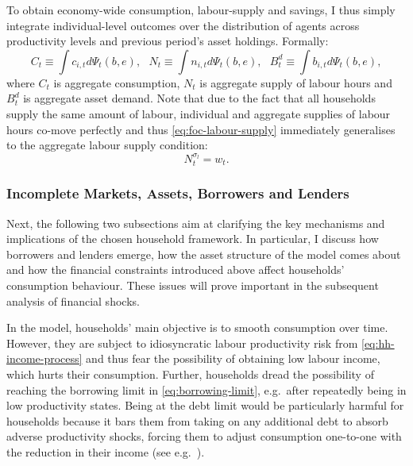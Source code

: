 \documentclass[12pt]{article} %
\numberwithin{equation}{section} %
\begin{document}

To obtain economy-wide consumption, labour-supply and savings, I thus simply integrate individual-level outcomes over the distribution of agents across productivity levels and previous period's asset holdings. Formally:
\begin{equation}
    C_t \equiv \int c_{i,t} d \Psi_t (b,e), \ \ \ N_t \equiv \int n_{i,t} d \Psi_t (b,e), \ \ \ B_t^d \equiv \int b_{i,t} d \Psi_t (b,e), \label{eq:hh-aggregation}
\end{equation}
where $C_t$ is aggregate consumption, $N_t$ is aggregate supply of labour hours and $B_t^d$ is aggregate asset demand. Note that due to the fact that all households supply the same amount of labour, individual and aggregate supplies of labour hours co-move perfectly and thus \eqref{eq:foc-labour-supply} immediately generalises to the aggregate labour supply condition:
\begin{equation}
    N_t^{\sigma_l} = w_t. \label{eq:hh-agg-labour-supply}
\end{equation}


\subsubsection{Incomplete Markets, Assets, Borrowers and Lenders}
\label{sec:model-hh-assets}

Next, the following two subsections aim at clarifying the key mechanisms and implications of the chosen household framework. In particular, I discuss how borrowers and lenders emerge, how the asset structure of the model comes about and how the financial constraints introduced above affect households' consumption behaviour. These issues will prove important in the subsequent analysis of financial shocks.

In the model, households' main objective is to smooth consumption over time. However, they are subject to idiosyncratic labour productivity risk from \eqref{eq:hh-income-process} and thus fear the possibility of obtaining low labour income, which hurts their consumption. Further, households dread the possibility of reaching the borrowing limit in \eqref{eq:borrowing-limit}, e.g.~after repeatedly being in low productivity states. Being at the debt limit would be particularly harmful for households because it bars them from taking on any additional debt to absorb adverse productivity shocks, forcing them to adjust consumption one-to-one with the reduction in their income (see e.g.~\cite{carroll2021}). 
\end{document}

